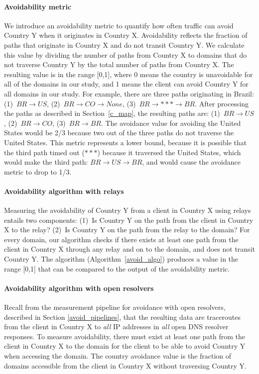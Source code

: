 \paragraph{Avoidability metric}  We introduce an avoidability metric to
quantify how often
traffic can avoid Country Y when it originates in Country X.
Avoidability reflects the fraction of paths that originate in Country
X and do not transit Country Y.  We calculate this value by dividing the
number of paths from Country X to domains that do not traverse Country Y
by the total number of paths from Country X. The resulting value is
in the range [0,1], where 0 means the country is unavoidable for all of
the domains in our study, and 1 means the client can avoid Country Y for
all domains in our study.  For example, there are three paths
originating in Brazil: (1)~$BR \rightarrow US$, (2)~$BR \rightarrow CO
\rightarrow None$, (3)~$BR \rightarrow *** \rightarrow BR$.  After
processing the paths as described in Section~\ref{c_map}, the resulting
paths are: (1)~$BR \rightarrow US$, (2)~$BR \rightarrow CO$, (3)~$BR
\rightarrow BR$.  The avoidance value for avoiding the United States
would be 2/3 because two out of the three paths do not traverse the
United States.  This metric represents a lower bound,
because it is possible that the third path timed out ($***$) because it
traversed the United States, which would make the third path: $BR
\rightarrow US \rightarrow BR$, and would cause the avoidance metric to
drop to 1/3.

\paragraph{Avoidability algorithm with relays}  Measuring the avoidability of Country Y
from a client in Country X using relays entails two components: (1)~Is Country Y
on the path from the client in Country X to the relay?  (2)~Is Country Y on
the path from the relay to the domain?  For every domain, our algorithm checks
if there exists at least one path from the client in Country X through any
relay and on to the domain, and does not transit Country Y.   The algorithm
(Algorithm~\ref{avoid_algo}) produces a value in the range [0,1] that can be
compared to the output of the avoidability metric.

\paragraph{Avoidability algorithm with open resolvers} Recall from the measurement pipeline for avoidance with open resolvers, described in Section \ref{avoid_pipelines}, that the resulting data are traceroutes from the client in Country X to \textit{all} IP addresses in \textit{all} open DNS resolver responses.  To measure avoidability, there must exist at least one path from the client in Country X to the domain for the client to be able to avoid Country Y when accessing the domain.  The country avoidance value is the fraction of domains accessible from the client in Country X without traversing Country Y.


